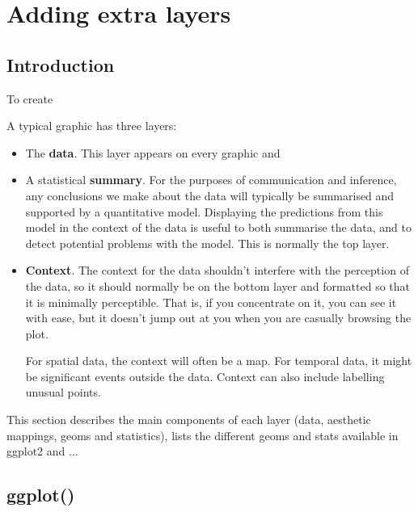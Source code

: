 


\chapter{Adding extra layers}

\section{Introduction}

To create 

A typical graphic has three layers:

\begin{itemize}
  \item The {\bf data}.  This layer appears on every graphic and 

  \item A statistical {\bf summary}.  For the purposes of communication and inference, any conclusions we make about the data will typically be summarised and supported by a quantitative model.  Displaying the predictions from this model in the context of the data is useful to both summarise the data, and to detect potential problems with the model.  This is normally the top layer.

  \item {\bf Context}.  The context for the data shouldn't interfere with the perception of the data, so it should normally be on the bottom layer and formatted so that it is minimally perceptible.  That is, if you concentrate on it, you can see it with ease, but it doesn't jump out at you when you are casually browsing the plot.
  
  For spatial data, the context will often be a map.  For temporal data, it might be significant events outside the data.  Context can also include labelling unusual points.
\end{itemize}

This section describes the main components of each layer (data, aesthetic mappings, geoms and statistics), lists the different geoms and stats available in ggplot2 and ...

\section{ggplot()}
\label{sec:ggplot}

